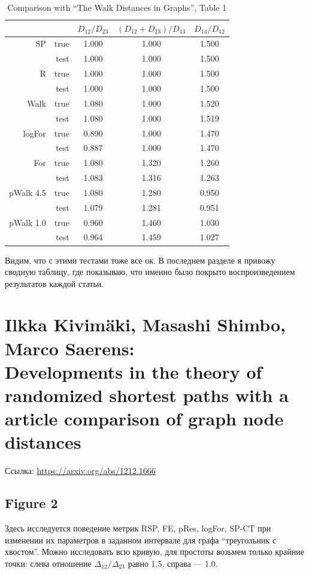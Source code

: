 \documentclass{article}
\begin{document}
\begin{table}[H]
\centering
\caption{Comparison with ``The Walk Distances in Graphs'', Table 1}
\label{my-label}
\begin{tabular}{rr|ccc}
          &      & $D_{12} / D_{23}$ & $(D_{12}+D_{23}) / D_{13}$ & $D_{14} / D_{12}$ \\
          \hline
SP        & true & 1.000 & 1.000 & 1.500 \\
          & test & 1.000 & 1.000 & 1.500 \\
          \hline
R         & true & 1.000 & 1.000 & 1.500 \\
          & test & 1.000 & 1.000 & 1.500 \\
          \hline
Walk      & true & 1.080 & 1.000 & 1.520 \\
          & test & 1.080 & 1.000 & 1.519 \\
          \hline
logFor    & true & 0.890 & 1.000 & 1.470 \\
          & test & 0.887 & 1.000 & 1.470 \\
          \hline
For       & true & 1.080 & 1.320 & 1.260 \\
          & test & 1.083 & 1.316 & 1.263 \\
          \hline
pWalk 4.5 & true & 1.080 & 1.280 & 0.950 \\
          & test & 1.079 & 1.281 & 0.951 \\
          \hline
pWalk 1.0 & true & 0.960 & 1.460 & 1.030 \\
          & test & 0.964 & 1.459 & 1.027 
\end{tabular}
\end{table}

Видим, что с этими тестами тоже все ок. В последнем разделе я привожу сводную таблицу, где показываю, что именно было покрыто воспроизведением результатов каждой статьи.


\section{Ilkka Kivim{\"a}ki, Masashi Shimbo, Marco Saerens:\\
         Developments in the theory of randomized shortest paths with a article comparison of graph node distances}
Ссылка: \url{https://arxiv.org/abs/1212.1666}

\subsection{Figure 2}
Здесь исследуется поведение метрик RSP, FE, pRes, logFor, SP-CT при изменении их параметров в заданном интервале для графа ``треугольник с хвостом''. Можно исследовать всю кривую, для простоты возьмем только крайние точки: слева отношение $\Delta_{12}/\Delta_{23}$ равно 1.5, справа --- 1.0.
\end{document}
